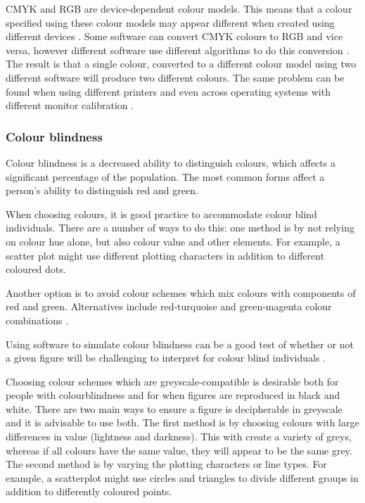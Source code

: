 \documentclass[letterpaper]{report}\usepackage[]{graphicx}\usepackage[]{color}
\begin{document}
CMYK and RGB are device-dependent colour models. This means that a colour specified using these colour models may appear different when created using different devices \cite{silva}. Some software can convert CMYK colours to RGB and vice versa, however different software use different algorithms to do this conversion \cite{brewer-colour}. The result is that a single colour, converted to a different colour model using two different software will produce two different colours. The same problem can be found when using different printers and even across operating systems with different monitor calibration \cite{brewer-colour}. 

\subsubsection{Colour blindness}
Colour blindness is a decreased ability to distinguish colours, which affects a significant percentage of the population. The most common forms affect a person's ability to distinguish red and green.

When choosing colours, it is good practice to accommodate colour blind individuals. There are a number of ways to do this: one method is by not relying on colour hue alone, but also colour value and other elements. For example, a scatter plot might use different plotting characters in addition to different coloured dots. 

Another option is to avoid colour schemes which mix colours with components of red and green. Alternatives include red-turquoise and green-magenta colour combinations \cite{wong4}.

Using software to simulate colour blindness can be a good test of whether or not a given figure will be challenging to interpret for colour blind individuals \cite{wong4}.

Choosing colour schemes which are greyscale-compatible is desirable both for people with colourblindness and for when figures are reproduced in black and white. There are two main ways to ensure a figure is decipherable in greyscale and it is advisable to use both. The first method is by choosing colours with large differences in value (lightness and darkness). This with create a variety of greys, whereas if all colours have the same value, they will appear to be the same grey. The second method is by varying the plotting characters or line types. For example, a scatterplot might use circles and triangles to divide different groups in addition to differently coloured points. 
\end{document}
